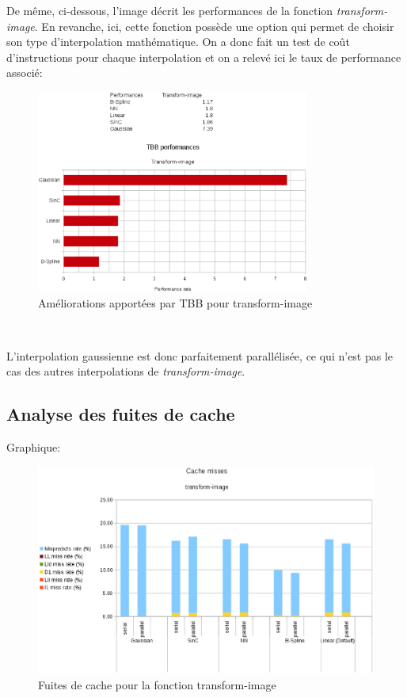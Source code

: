 \documentclass[10pt]{report}
\begin{document}
	De même, ci-dessous, l'image décrit les performances de la fonction \textit{transform-image}. En revanche, ici, cette fonction possède une option qui permet de choisir son type d'interpolation mathématique. On a donc fait un test de coût d'instructions pour chaque interpolation et on a relevé ici le taux de performance associé:
	\begin{figure}[h!]
		\begin{center}
			\includegraphics[width=9cm]{Reports/figures/performances_tbb_transform_image.eps}
		\end{center}	
		\caption{Améliorations apportées par TBB pour transform-image}
		\label{Améliorations apportées par TBB pour transform-image}
	\end{figure}~\par
	L'interpolation gaussienne est donc parfaitement parallélisée, ce qui n'est pas le cas des autres interpolations de \textit{transform-image}.
	\subsection{Analyse des fuites de cache}
	Graphique: 
		\begin{figure}[h!]
			\begin{center}
				\includegraphics[width=15cm]{Reports/figures/cache_misses_transform_image.eps}
			\end{center}	
			\caption{Fuites de cache pour la fonction transform-image}
			\label{Fuites de cache pour la fonction transform-image}
		\end{figure}~\par
	
\end{document}
